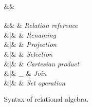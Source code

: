 \begin{figure}

\begin{syntax}


\synDef{\pCond}{\pCondSet}
  &\eqq&  \\
\\[1.5ex]

\synDef{\pQ}{\pQSet}
  &\eqq& \pRel                 & \textit{Relation reference} \\
     &|& \pRen[\pRel]{\pQ}     & \textit{Renaming} \\
     &|& \pPrj[\pAttList]{\pQ} & \textit{Projection} \\
     &|& \pSel\pQ              & \textit{Selection} \\
     &|& \pQ \times \pQ & \textit{Cartesian product}\\
     &|& \pQ \Join_{\pCond} \pQ  & \textit{Join} \\
     &|& \pQ \circ \pQ & \textit{Set operation}\\
\end{syntax}

\caption{Syntax of  relational algebra.
}
\label{fig:rel-alg}
\end{figure}
